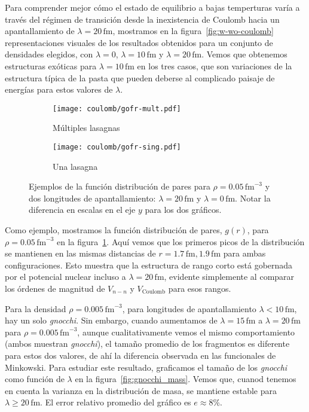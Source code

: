 Para comprender mejor cómo el estado de equilibrio a bajas temperturas varía a través del régimen de transición desde la inexistencia de Coulomb hacia un apantallamiento de $\lambda=20\,\text{fm}$, mostramos en la figura~\ref{fig:w-wo-coulomb} representaciones visuales de los resultados obtenidos para un conjunto de densidades elegidos, con $\lambda=0$, $\lambda=10\,\text{fm}$ y $\lambda=20\,\text{fm}$.
Vemos que obtenemos estructuras exóticas para $\lambda=10\,\text{fm}$ en los tres casos, que son variaciones de la estructura típica de la pasta que pueden deberse al complicado paisaje de energías para estos valores de $\lambda$.

\begin{figure}[h!]  %
\centering
\begin{subfigure}[h!]{0.4\columnwidth}
  \centering
  \texttt{[image: coulomb/gofr-mult.pdf]}
  \caption{Múltiples lasagnas}
\end{subfigure}
\begin{subfigure}[h!]{0.4\columnwidth}
  \centering
  \texttt{[image: coulomb/gofr-sing.pdf]}
  \caption{Una lasagna}
\end{subfigure}
\caption{Ejemplos de la función distribución de pares para $\rho=0.05\,\text{fm}^{-3}$ y dos longitudes de apantallamiento:
  $\lambda=20\,\text{fm}$ y $\lambda=0\,\text{fm}$.
  Notar la diferencia en escalas en el eje $y$ para los dos gráficos.}
\label{fig:gofr}
\end{figure}

Como ejemplo, mostramos la función distribución de pares, $g(r)$, para $\rho=0.05\,\text{fm}^{-3}$ en la figura~\ref{fig:gofr}.
Aquí vemos que los primeros picos de la distribución se mantienen en las mismas distancias de $r=1.7\,\text{fm}, 1.9\,\text{fm}$ para ambas configuraciones.
Esto muestra que la estructura de rango corto está gobernada por el potencial nuclear incluso a $\lambda=20\,\text{fm}$, evidente simplemente al comparar los órdenes de magnitud de $V_{n-n}$ y $V_{\text{Coulomb}}$ para esos rangos.

Para la densidad $\rho=0.005\,\text{fm}^{-3}$, para longitudes de apantallamiento $\lambda<10\,\text{fm}$, hay un solo \emph{gnocchi}.
Sin embargo, cuando aumentamos de $\lambda=15\,\text{fm}$ a $\lambda=20\,\text{fm}$ para $\rho=0.005\,\text{fm}^{-3}$, aunque cualitativamente vemos el mismo comportamiento (ambos muestran \emph{gnocchi}), el tamaño promedio de los fragmentos es diferente para estos dos valores, de ahí la diferencia observada en las funcionales de Minkowski.
Para estudiar este resultado, graficamos el tamaño de los \emph{gnocchi} como función de $\lambda$ en la figura~\ref{fig:gnocchi_mass}.
Vemos que, cuanod tenemos en cuenta la varianza en la distribución de masa, se mantiene estable para $\lambda\geq20\,\text{fm}$.
El error relativo promedio del gráfico es $e\approx8\%$.

